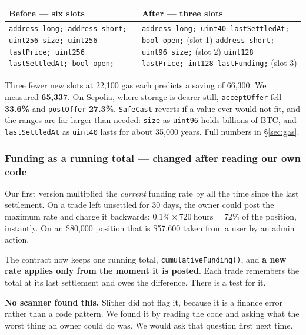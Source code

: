 \documentclass[11pt,a4paper]{article}
\newcommand{\cbox}[1]{%
  \begin{center}\colorbox{panel}{\parbox{0.95\textwidth}{\vspace{3pt}#1\vspace{3pt}}}\end{center}}
\begin{document}
\begin{center}\footnotesize
\begin{tabular}{@{}p{7.2cm}p{7.2cm}@{}}
\toprule
\textbf{Before — six slots} & \textbf{After — three slots} \\
\midrule
\texttt{address long; address short; uint256 size; uint256 lastPrice; uint256 lastSettledAt; bool open;} &
\texttt{address long; uint40 lastSettledAt; bool open;} \quad(slot 1)\newline
\texttt{address short; uint96 size;} \quad(slot 2)\newline
\texttt{uint128 lastPrice; int128 lastFunding;} \quad(slot 3) \\
\bottomrule
\end{tabular}
\end{center}

Three fewer new slots at 22,100 gas each predicts a saving of 66,300. We measured \textbf{65,337}.
On Sepolia, where storage is dearer still, \texttt{acceptOffer} fell \textbf{33.6\%} and
\texttt{postOffer} \textbf{27.3\%}. \texttt{SafeCast} reverts if a value ever would not fit, and the
ranges are far larger than needed: \texttt{size} as \texttt{uint96} holds billions of BTC, and
\texttt{lastSettledAt} as \texttt{uint40} lasts for about 35,000 years. Full numbers in
\S\ref{sec:gas}.

\subsubsection{Funding as a running total — changed after reading our own code}

Our first version multiplied the \emph{current} funding rate by all the time since the last
settlement. On a trade left unsettled for 30 days, the owner could post the maximum rate and charge
it backwards: $0.1\% \times 720\ \text{hours} = 72\%$ of the position, instantly. On an \$80,000
position that is \$57,600 taken from a user by an admin action.

The contract now keeps one running total, \texttt{cumulativeFunding()}, and \textbf{a new rate
applies only from the moment it is posted}. Each trade remembers the total at its last settlement
and owes the difference. There is a test for it.

\cbox{\textbf{No scanner found this.} Slither did not flag it, because it is a finance error rather
than a code pattern. We found it by reading the code and asking what the worst thing an owner could
do was. We would ask that question first next time.}
\end{document}
